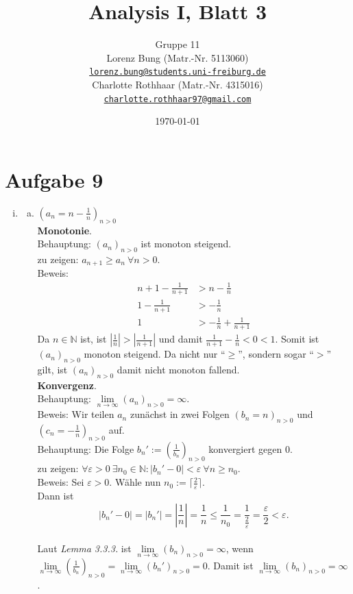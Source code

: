 \documentclass[12pt,a4paper]{article}
\title{Analysis I, Blatt 3}
\author{
    Gruppe 11\\
    Lorenz Bung (Matr.-Nr. 5113060)\\
    \href{mailto:lorenz.bung@students.uni-freiburg.de}{\texttt{lorenz.bung@students.uni-freiburg.de}}\\
    Charlotte Rothhaar (Matr.-Nr. 4315016)\\
    \href{mailto:charlotte.rothhaar97@gmail.com}{\texttt{charlotte.rothhaar97@gmail.com}}
}
\date{\today}
\begin{document}
\maketitle


\section*{Aufgabe 9}

\begin{enumerate}[(i)]
    \item \begin{enumerate}[(a)]
        \item $(a_n = n - \frac{1}{n})_{n > 0}$\\

        \textbf{Monotonie}.\\
        Behauptung: $(a_n)_{n>0}$ ist monoton steigend.\\
        zu zeigen: $a_{n+1} \geq a_n\ \forall n>0$.\\
        Beweis: \begin{align*}
            n + 1 - \frac{1}{n+1} &> n - \frac{1}{n}\\
            1 - \frac{1}{n+1} &> - \frac{1}{n}\\
            1 &> -\frac{1}{n} + \frac{1}{n+1}
        \end{align*}
        Da $n \in \mathbb{N}$ ist, ist $|\frac{1}{n}| > |\frac{1}{n+1}|$ und damit $\frac{1}{n+1} - \frac{1}{n} < 0 < 1$.
        Somit ist $(a_n)_{n>0}$ monoton steigend.
        Da nicht nur ``$\geq$'', sondern sogar ``$>$'' gilt, ist $(a_n)_{n>0}$ damit nicht monoton fallend.\\

        \textbf{Konvergenz}.\\
        Behauptung: $\lim\limits_{n \to \infty} (a_n)_{n>0} = \infty$.\\
        Beweis: Wir teilen $a_n$ zunächst in zwei Folgen $(b_n = n)_{n>0}$ und $(c_n = - \frac{1}{n})_{n>0}$ auf.\\

        Behauptung: Die Folge $b_n' := (\frac{1}{b_n})_{n>0}$ konvergiert gegen $0$.\\
        zu zeigen: $\forall \varepsilon > 0\ \exists n_0 \in \mathbb{N}: |b_n' - 0| < \varepsilon\ \forall n \geq n_0$.\\
        Beweis:
        Sei $\varepsilon > 0$.
        Wähle nun $n_0 := \lceil\frac{2}{\varepsilon}\rceil$.\\
        Dann ist $$|b_n' - 0| = |b_n'| = |\frac{1}{n}| = \frac{1}{n} \leq \frac{1}{n_0} = \frac{1}{\frac{2}{\varepsilon}} = \frac{\varepsilon}{2} < \varepsilon.$$\\
        Laut \textit{Lemma 3.3.3.} ist $\lim\limits_{n \to \infty}(b_n)_{n>0} = \infty$, wenn $\lim\limits_{n \to \infty}(\frac{1}{b_n})_{n>0} = \lim\limits_{n \to \infty}(b_n')_{n>0} = 0$.
        Damit ist $\lim\limits_{n \to \infty}(b_n)_{n>0} = \infty$.\\


\end{enumerate}
\end{enumerate}
\end{document}
